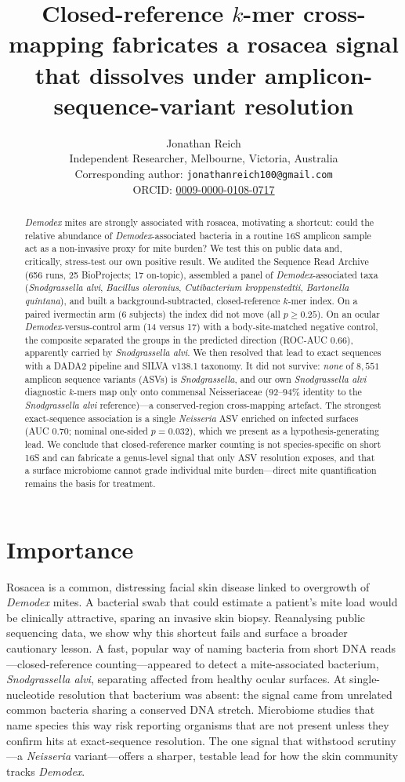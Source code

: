 \documentclass[11pt]{article}
\title{Closed-reference $k$-mer cross-mapping fabricates a \salvi{} rosacea
signal that dissolves under amplicon-sequence-variant resolution}
\author{Jonathan Reich \\
  {\small Independent Researcher, Melbourne, Victoria, Australia} \\
  {\small Corresponding author: \texttt{jonathanreich100@gmail.com}} \\
  {\small ORCID: \href{https://orcid.org/0009-0000-0108-0717}{0009-0000-0108-0717}}}
\date{}
\newcommand{\salvi}{\textit{Snodgrassella alvi}}
\newcommand{\demodex}{\textit{Demodex}}
\begin{document}
\maketitle

\begin{abstract}
\demodex{} mites are strongly associated with rosacea, motivating a shortcut:
could the relative abundance of \demodex-associated bacteria in a
routine 16S amplicon sample act as a non-invasive proxy for mite burden? We test
this on public data and, critically, stress-test our own positive result. We
audited the Sequence Read Archive (656
runs, 25 BioProjects; 17 on-topic), assembled a panel of \demodex-associated taxa
(\salvi{}, \textit{Bacillus oleronius}, \textit{Cutibacterium kroppenstedtii},
\textit{Bartonella quintana}), and built a background-subtracted, closed-reference
$k$-mer index. On a paired ivermectin arm (6 subjects) the index did not move
(all $p \ge 0.25$). On an ocular \demodex-versus-control arm (14 versus 17) with a
body-site-matched negative control, the composite separated the groups in the
predicted direction (ROC-AUC $0.66$), apparently carried by \salvi{}. We then
resolved that lead to exact sequences with a DADA2 pipeline and SILVA v138.1
taxonomy. It did not survive:
\emph{none} of $8{,}551$ amplicon sequence variants (ASVs) is
\textit{Snodgrassella}, and our own \salvi{} diagnostic $k$-mers map only onto
commensal Neisseriaceae ($92$--$94\%$ identity to the \salvi{} reference)---a
conserved-region cross-mapping artefact. The strongest exact-sequence association
is a single \textit{Neisseria} ASV enriched on infected surfaces
(AUC $0.70$; nominal one-sided $p=0.032$), which we present as a
hypothesis-generating lead. We conclude that closed-reference marker counting is
not species-specific on short 16S and can fabricate a genus-level signal that
only ASV resolution exposes, and that a surface microbiome cannot grade
individual mite burden---direct mite quantification remains the basis for
treatment.
\end{abstract}

\section*{Importance}
Rosacea is a common, distressing facial skin disease linked to overgrowth of
\demodex{} mites. A bacterial swab that could estimate a patient's mite load
would be clinically attractive, sparing an invasive skin biopsy. Reanalysing
public sequencing data, we show why this shortcut fails and surface a broader
cautionary lesson. A fast, popular way of naming bacteria from short DNA
reads---closed-reference counting---appeared to detect a mite-associated
bacterium, \salvi{}, separating affected from healthy ocular surfaces. At
single-nucleotide resolution that bacterium was absent: the signal came from
unrelated common bacteria sharing a conserved DNA stretch. Microbiome studies
that name species this way risk reporting organisms that are not present unless
they confirm hits at exact-sequence resolution. The one signal that withstood
scrutiny---a \textit{Neisseria} variant---offers a sharper, testable lead for how
the skin community tracks \demodex{}.
\end{document}
